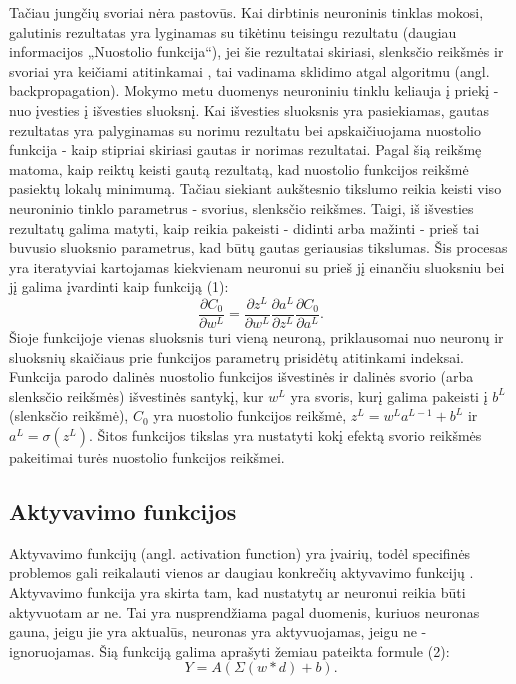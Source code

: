 \documentclass{VUMIFPSbakalaurinis}
\begin{document}
Tačiau jungčių svoriai nėra pastovūs. Kai dirbtinis neuroninis tinklas mokosi, galutinis rezultatas yra lyginamas su tikėtinu teisingu rezultatu (daugiau informacijos „Nuostolio funkcija“), jei šie
rezultatai skiriasi, slenksčio reikšmės ir svoriai yra keičiami atitinkamai \cite{backpropogation}, tai vadinama sklidimo atgal algoritmu (angl. backpropagation).
Mokymo metu duomenys neuroniniu tinklu keliauja į priekį - nuo įvesties į išvesties sluoksnį. Kai išvesties sluoksnis yra pasiekiamas, gautas rezultatas yra palyginamas su norimu rezultatu bei 
apskaičiuojama nuostolio funkcija - kaip stipriai skiriasi gautas ir norimas rezultatai. Pagal šią reikšmę matoma, kaip reiktų keisti gautą rezultatą, kad nuostolio funkcijos reikšmė pasiektų lokalų 
minimumą. Tačiau siekiant aukštesnio tikslumo reikia keisti viso neuroninio tinklo parametrus - svorius, slenksčio reikšmes. Taigi, iš išvesties rezultatų galima matyti, kaip reikia pakeisti - 
didinti arba mažinti - prieš tai buvusio sluoksnio parametrus, kad būtų gautas geriausias tikslumas. Šis procesas yra iteratyviai kartojamas kiekvienam neuronui su prieš jį einančiu sluoksniu bei jį galima įvardinti kaip funkciją (1):
\begin{equation}
\frac{\partial{C_{0}}}{\partial{w^{L}}} = \frac{\partial{z^{L}}}{\partial{w^{L}}} \frac{\partial{a^{L}}}{\partial{z^{L}}} \frac{\partial{C_{0}}}{\partial{a^{L}}}.
\end{equation}
Šioje funkcijoje vienas sluoksnis turi vieną neuroną, priklausomai nuo neuronų ir sluoksnių skaičiaus prie funkcijos parametrų prisidėtų atitinkami indeksai. Funkcija parodo dalinės nuostolio funkcijos 
išvestinės ir dalinės svorio (arba slenksčio reikšmės) išvestinės santykį, kur \(w^{L}\) yra svoris, kurį galima pakeisti į \(b^{L}\) (slenksčio reikšmė), \(C_{0}\) yra nuostolio funkcijos reikšmė, 
\(z^{L} = w^{L}a^{L-1}+b^{L}\) ir \(a^{L}=\sigma(z^{L})\). Šitos funkcijos tikslas yra nustatyti kokį efektą svorio reikšmės pakeitimai turės nuostolio funkcijos reikšmei.

\subsection{Aktyvavimo funkcijos}
Aktyvavimo funkcijų (angl. activation function) yra įvairių, todėl specifinės problemos gali reikalauti vienos ar daugiau konkrečių aktyvavimo funkcijų \cite{activation}.
Aktyvavimo funkcija yra skirta tam, kad nustatytų ar neuronui reikia būti aktyvuotam ar ne. Tai yra nusprendžiama pagal duomenis, kuriuos neuronas gauna, jeigu jie yra aktualūs, neuronas yra aktyvuojamas, jeigu ne - ignoruojamas.
Šią funkciją galima aprašyti žemiau pateikta formule (2):
\begin{equation}
Y = A(\Sigma{(w * d) + b}).
\end{equation}
\end{document}

